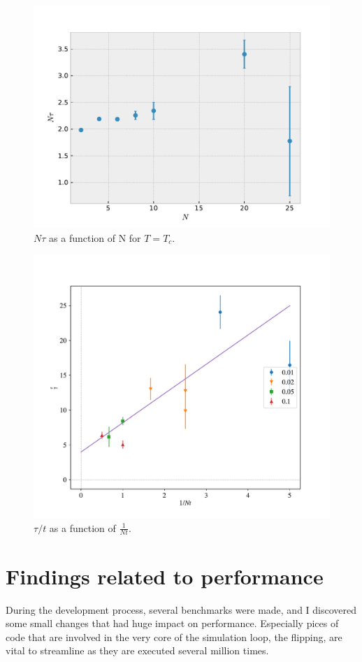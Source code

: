 \documentclass{article}
\begin{document}
\begin{figure}[ht]
  \centering
  \includegraphics[width=.75\textwidth]{media/tau_N}
  \caption{$N\tau$ as a function of N for $T=T_c$.\label{fig:tau_N}}
\end{figure}

\begin{figure}[ht]
  \centering
  \includegraphics[width=.75\textwidth]{media/tau_TN}
  \caption{$\tau/t$ as a function of $\frac{1}{N t}$.\label{fig:tau_TN}}
\end{figure}


\section{Findings related to performance}
During the development process, several benchmarks were made, and I discovered some small changes that had huge impact on performance.
Especially pices of code that are involved in the very core of the simulation loop, the flipping, are vital to streamline as they are executed several million times.
\end{document}
